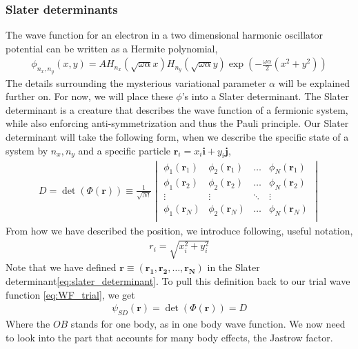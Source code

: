 \documentclass[11pt]{article}
\begin{document}
\subsubsection{Slater determinants}
The wave function for an electron in a two dimensional harmonic oscillator potential can be written as a Hermite polynomial,
\begin{align}
	\phi_{n_x,n_y}(x,y) = AH_{n_x} (\sqrt{\omega\alpha}x) H_{n_y} (\sqrt{\omega\alpha} y) \exp{\left(-\frac{\omega\alpha}{2}\left( x^2 + y^2 \right)\right)}
\end{align}
The details surrounding the mysterious variational parameter $\alpha$ will be explained further on. For now, we will place these $\phi$'s into a Slater determinant. The Slater determinant is a creature that describes the wave function of a fermionic system, while also enforcing anti-symmetrization and thus the Pauli principle. Our Slater determinant will take the following form, when we describe the specific state of a system by $n_x, n_y$ and a specific particle $\mathbf{r}_i = x_i\mathbf{i} + y_i\mathbf{j}$,
\begin{align}
	D = \det(\Phi(\mathbf{r})) \equiv \frac{1}{\sqrt{N!}}
	\begin{vmatrix}
		\phi_1(\mathbf{r}_1)	& \phi_2(\mathbf{r}_1) 	& \hdots 	& \phi_N(\mathbf{r}_1) 	\\
		\phi_1(\mathbf{r}_2) 	& \phi_2(\mathbf{r}_2) 	& \hdots 	& \phi_N(\mathbf{r}_2) 	\\
		\vdots 					& \vdots				& \ddots 	& \vdots 				\\
		\phi_1(\mathbf{r}_N) 	& \phi_2(\mathbf{r}_N) 	& \hdots 	& \phi_N(\mathbf{r}_N) 	\\
	\end{vmatrix}
	\label{eq:slater_determinant}
\end{align}
From how we have described the position, we introduce following, useful notation, 
\begin{align}
	r_i = \sqrt{x_i^2 + y_i^2}
	\label{eq:position-length}
\end{align}
Note that we have defined $\mathbf{r} \equiv (\mathbf{r_1},\mathbf{r_2},\dots,\mathbf{r_N})$ in the Slater determinant\eqref{eq:slater_determinant}. To pull this definition back to our trial wave function \eqref{eq:WF_trial}, we get
\begin{align}
	\psi_{SD}(\mathbf{r}) = \det(\Phi(\mathbf{r})) = D
	\label{eq:WF_onebody}
\end{align}
Where the $OB$ stands for one body, as in one body wave function. We now need to look into the part that accounts for many body effects, the Jastrow factor.
\end{document}
